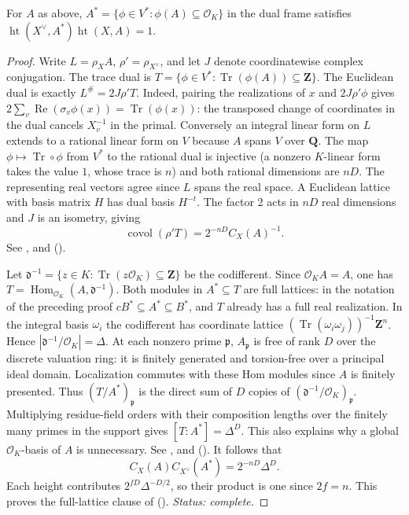 \begin{lemma}\label{lem:P5-eval-realize}
For $A$ as above, $A^*=\{\phi\in V^*:\phi(A)\subseteq\mathcal O_K\}$
in the dual frame satisfies
$\operatorname{ht}(X^\vee,A^*)\operatorname{ht}(X,A)=1$.
\end{lemma}
\begin{proof}
Write $L=\rho_X A$, $\rho'=\rho_{X^\vee}$, and let $J$ denote
coordinatewise complex conjugation. The trace dual is
$T=\{\phi\in V^*:\operatorname{Tr}(\phi(A))\subseteq\mathbf Z\}$.
The Euclidean dual is exactly $L^\#=2J\rho' T$. Indeed, pairing the
realizations of $x$ and $2J\rho'\phi$ gives
$2\sum_v\operatorname{Re}(\sigma_v\phi(x))=\operatorname{Tr}(\phi(x))$:
the transposed change of coordinates in the dual cancels $X_v^{-1}$
in the primal. Conversely an integral linear form on $L$ extends to
a rational linear form on $V$ because $A$ spans $V$ over $\mathbf Q$.
The map $\phi\mapsto\operatorname{Tr}\circ\phi$ from $V^*$ to the
rational dual is injective (a nonzero $K$-linear form takes the value
$1$, whose trace is $n$) and both rational dimensions are $nD$.
The representing real vectors agree since $L$ spans the real space.
A Euclidean lattice with basis matrix $H$ has dual basis $H^{-t}$.
The factor 2 acts in $nD$ real dimensions and $J$ is an isometry, giving
\[
 \operatorname{covol}(\rho'T)=2^{-nD}C_X(A)^{-1}.
\]
See ,  and
 ().

Let $\mathfrak d^{-1}=\{z\in K:\operatorname{Tr}(z\mathcal O_K)
\subseteq\mathbf Z\}$ be the codifferent. Since $\mathcal O_K A=A$,
one has $T=\operatorname{Hom}_{\mathcal O_K}(A,\mathfrak d^{-1})$.
Both modules in $A^*\subseteq T$ are full lattices: in the notation of
the preceding proof $cB^*\subseteq A^*\subseteq B^*$, and $T$ already
has a full real realization. In the integral basis $\omega_i$ the
codifferent has coordinate lattice
$(\operatorname{Tr}(\omega_i\omega_j))^{-1}\mathbf Z^n$.
Hence $|\mathfrak d^{-1}/\mathcal O_K|=\Delta$.
At each nonzero prime $\mathfrak p$, $A_{\mathfrak p}$ is free of rank $D$
over the discrete valuation ring: it is finitely generated and
torsion-free over a principal ideal domain. Localization commutes with
these Hom modules since $A$ is finitely presented. Thus
$(T/A^*)_{\mathfrak p}$ is the direct sum of $D$ copies of
$(\mathfrak d^{-1}/\mathcal O_K)_{\mathfrak p}$. Multiplying residue-field
orders with their composition lengths over the finitely many primes in
the support gives $[T:A^*]=\Delta^D$. This also explains why a global
$\mathcal O_K$-basis of $A$ is unnecessary. See
,  and 
().
It follows that
\[
 C_X(A)C_{X^\vee}(A^*)=2^{-nD}\Delta^D .
\]
Each height contributes $2^{fD}\Delta^{-D/2}$, so their product is one
since $2f=n$. This proves the full-lattice clause of
 ().
\emph{Status: complete.}
\end{proof}

